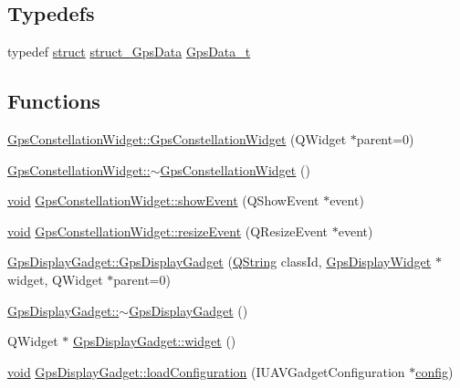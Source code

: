 \subsection*{Typedefs}
\begin{DoxyCompactItemize}
\item 
typedef \hyperlink{sdlgamepad_8dox_aba655c5729da86df745f0c8e7f9ba8d2}{struct} \hyperlink{structstruct___gps_data}{struct\-\_\-\-Gps\-Data} \hyperlink{group___g_p_s_gadget_plugin_ga4f1b5520a42a0033fb4d09fc7cbc2197}{Gps\-Data\-\_\-t}
\end{DoxyCompactItemize}
\subsection*{Functions}
\begin{DoxyCompactItemize}
\item 
\hyperlink{group___g_p_s_gadget_plugin_gaa8d0d3435153893cbf167a1e5820d979}{Gps\-Constellation\-Widget\-::\-Gps\-Constellation\-Widget} (Q\-Widget $\ast$parent=0)
\item 
\hyperlink{group___g_p_s_gadget_plugin_gaa4c124f26c71bf318147e079011fe137}{Gps\-Constellation\-Widget\-::$\sim$\-Gps\-Constellation\-Widget} ()
\item 
\hyperlink{group___u_a_v_objects_plugin_ga444cf2ff3f0ecbe028adce838d373f5c}{void} \hyperlink{group___g_p_s_gadget_plugin_ga6b206d00a88aa90134aba5ca815355a9}{Gps\-Constellation\-Widget\-::show\-Event} (Q\-Show\-Event $\ast$event)
\item 
\hyperlink{group___u_a_v_objects_plugin_ga444cf2ff3f0ecbe028adce838d373f5c}{void} \hyperlink{group___g_p_s_gadget_plugin_ga33f2f0f0eba2737a2917b206fda14a11}{Gps\-Constellation\-Widget\-::resize\-Event} (Q\-Resize\-Event $\ast$event)
\item 
\hyperlink{group___g_p_s_gadget_plugin_ga748699eae5b29ee0958be37c23a348f8}{Gps\-Display\-Gadget\-::\-Gps\-Display\-Gadget} (\hyperlink{group___u_a_v_objects_plugin_gab9d252f49c333c94a72f97ce3105a32d}{Q\-String} class\-Id, \hyperlink{class_gps_display_widget}{Gps\-Display\-Widget} $\ast$widget, Q\-Widget $\ast$parent=0)
\item 
\hyperlink{group___g_p_s_gadget_plugin_ga6ec785be3eefba596601b671573f6401}{Gps\-Display\-Gadget\-::$\sim$\-Gps\-Display\-Gadget} ()
\item 
Q\-Widget $\ast$ \hyperlink{group___g_p_s_gadget_plugin_ga343958b41e6a9deb4720c9b3098396c2}{Gps\-Display\-Gadget\-::widget} ()
\item 
\hyperlink{group___u_a_v_objects_plugin_ga444cf2ff3f0ecbe028adce838d373f5c}{void} \hyperlink{group___g_p_s_gadget_plugin_gace7e777ca2b6d35514b22ec3b8d9f7c5}{Gps\-Display\-Gadget\-::load\-Configuration} (I\-U\-A\-V\-Gadget\-Configuration $\ast$\hyperlink{deflate_8c_a4473b5227787415097004fd39f55185e}{config})

\end{DoxyCompactItemize}
